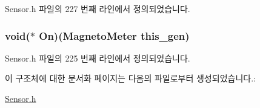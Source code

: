 Sensor.\-h 파일의 227 번째 라인에서 정의되었습니다.

\hypertarget{struct___magneto_meter_adaae4fb51ff33457e414eb8924c85075}{
\subsubsection[{On}]{\setlength{\rightskip}{0pt plus 5cm}void($\ast$  On)({\bf Magneto\-Meter} this\-\_\-gen)}}\label{struct___magneto_meter_adaae4fb51ff33457e414eb8924c85075}


Sensor.\-h 파일의 225 번째 라인에서 정의되었습니다.



이 구조체에 대한 문서화 페이지는 다음의 파일로부터 생성되었습니다.\-:\begin{DoxyCompactItemize}
\item 
\hyperlink{_sensor_8h}{Sensor.\-h}\end{DoxyCompactItemize}
